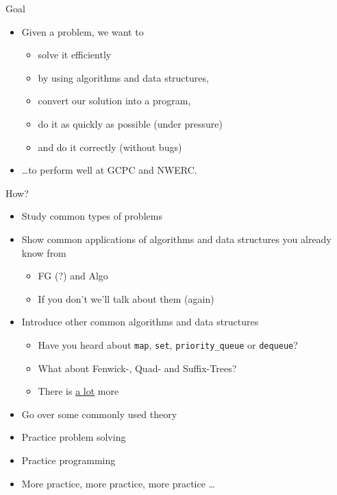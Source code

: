 \documentclass[12pt,t]{beamer}
\newcommand{\bi}{\begin{itemize}}
\newcommand{\ei}{\end{itemize}}
\begin{document}
\begin{frame}{Goal}

    \vspace{30pt}

    \bi
        \item Given a problem, we want to
            \bi
                \item solve it efficiently
                \item by using algorithms and data structures,
                \item convert our solution into a program,
                \item do it as quickly as possible (under pressure)
                \item and do it correctly (without bugs)
            \ei

        \vspace{20pt}

        \item \dots to perform well at GCPC and NWERC.
    \ei
\end{frame}

\begin{frame}{How?}
    \vspace{10pt}

    \bi
        \item Study common types of problems
        \item Show common applications of algorithms and data structures you already know from
            \bi
                \item FG (?) and Algo
                \item If you don't we'll talk about them (again)
            \ei
        \item Introduce other common algorithms and data structures
        \bi
	  \item Have you heard about \texttt{map}, \texttt{set}, \texttt{priority\_queue} or \texttt{dequeue}?
	  \item What about Fenwick-, Quad- and Suffix-Trees? 
	  \item There is \underline{a lot} more
        \ei
        \item Go over some commonly used theory
        \item Practice problem solving
        \item Practice programming
        \item More practice\pause, more practice\pause, more practice \dots
    \ei
\end{frame}
\end{document}
